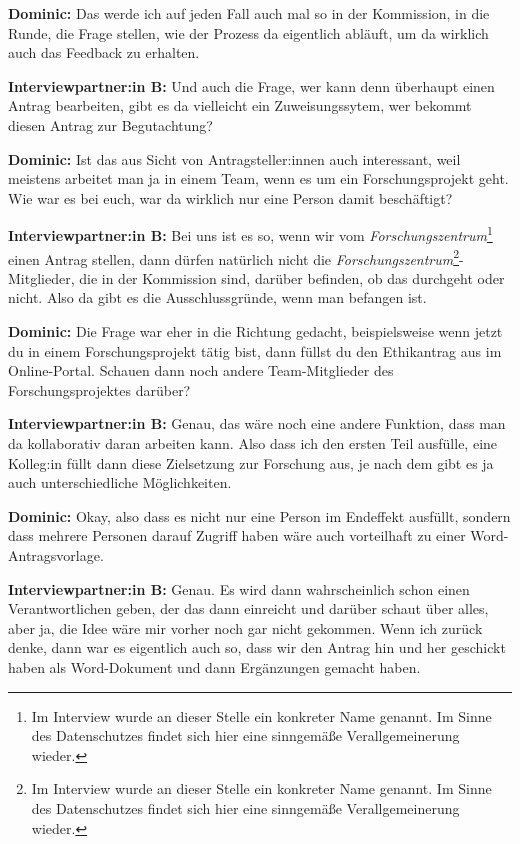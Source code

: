 \documentclass[a4paper,12pt,twoside]{scrreprt}
\begin{document}
\textbf{Dominic:} Das werde ich auf jeden Fall auch mal so in der Kommission, in die Runde, die Frage stellen, wie der Prozess da eigentlich abläuft, um da wirklich auch das Feedback zu erhalten.

\textbf{Interviewpartner:in B:} Und auch die Frage, wer kann denn überhaupt einen Antrag bearbeiten, gibt es da vielleicht ein Zuweisungssytem, wer bekommt diesen Antrag zur Begutachtung?

\textbf{Dominic:} Ist das aus Sicht von Antragsteller:innen auch interessant, weil meistens arbeitet man ja in einem Team, wenn es um ein Forschungsprojekt geht. Wie war es bei euch, war da wirklich nur eine Person damit beschäftigt?

\textbf{Interviewpartner:in B:} Bei uns ist es so, wenn wir vom \textit{Forschungszentrum}\footnote{Im Interview wurde an dieser Stelle ein konkreter Name genannt. Im Sinne des Datenschutzes findet sich hier eine sinngemäße Verallgemeinerung wieder.} einen Antrag stellen, dann dürfen natürlich nicht die \textit{Forschungszentrum}\footnote{Im Interview wurde an dieser Stelle ein konkreter Name genannt. Im Sinne des Datenschutzes findet sich hier eine sinngemäße Verallgemeinerung wieder.}-Mitglieder, die in der Kommission sind, darüber befinden, ob das durchgeht oder nicht. Also da gibt es die Ausschlussgründe, wenn man befangen ist.

\textbf{Dominic:} Die Frage war eher in die Richtung gedacht, beispielsweise wenn jetzt du in einem Forschungsprojekt tätig bist, dann füllst du den Ethikantrag aus im Online-Portal. Schauen dann noch andere Team-Mitglieder des Forschungsprojektes darüber?

\textbf{Interviewpartner:in B:} Genau, das wäre noch eine andere Funktion, dass man da kollaborativ daran arbeiten kann. Also dass ich den ersten Teil ausfülle, eine Kolleg:in füllt dann diese Zielsetzung zur Forschung aus, je nach dem gibt es ja auch unterschiedliche Möglichkeiten.

\textbf{Dominic:} Okay, also dass es nicht nur eine Person im Endeffekt ausfüllt, sondern dass mehrere Personen darauf Zugriff haben wäre auch vorteilhaft zu einer Word-Antragsvorlage.

\textbf{Interviewpartner:in B:} Genau. Es wird dann wahrscheinlich schon einen Verantwortlichen geben, der das dann einreicht und darüber schaut über alles, aber ja, die Idee wäre mir vorher noch gar nicht gekommen. Wenn ich zurück denke, dann war es eigentlich auch so, dass wir den Antrag hin und her geschickt haben als Word-Dokument und dann Ergänzungen gemacht haben.
\end{document}
